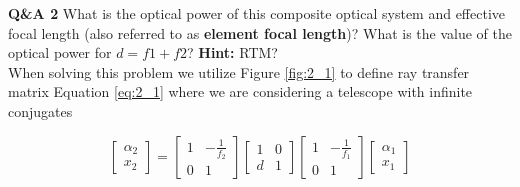 \documentclass[main.tex]{subfiles}
\begin{document}





\textbf{Q\&A 2} What is the optical power of this composite optical system and effective focal length (also referred to as \textbf{element focal length})? What is the value of the optical power for $d=f1+f2$? \textbf{Hint:} RTM?\\

When solving this problem we utilize Figure \ref{fig:2_1} to define ray transfer matrix Equation \ref{eq:2_1} where we are considering a telescope with infinite conjugates

\begin{equation}\label{eq:2_1}
\begin{bmatrix}
    \alpha_2 \\
    x_2
\end{bmatrix}
=
\begin{bmatrix}
    1   &   -\frac{1}{f_2} \\
    0   &   1
\end{bmatrix}
\begin{bmatrix}
    1   &   0 \\
    d   &   1
\end{bmatrix}
\begin{bmatrix}
    1   &   -\frac{1}{f_1} \\
    0   &   1
\end{bmatrix}
\begin{bmatrix}
    \alpha_{1} \\
    x_1
\end{bmatrix}
\end{equation}
\end{document}
